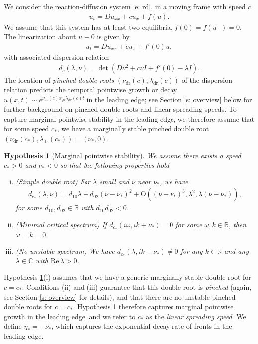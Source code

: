 \documentclass[11pt]{article}
\newcommand{\R}{\mathbb{R}}
\newcommand{\C}{\mathbb{C}}
\renewcommand{\Re}{\mathrm{Re} \,}
\newtheorem{hyp}{Hypothesis}
\numberwithin{equation}{section}
\numberwithin{prop}{section}
\begin{document}
We consider the reaction-diffusion system \eqref{e: rd}, in a moving frame with speed $c$
\begin{align}
u_t = Du_{xx} + c u_x + f(u). 
\end{align}
We assume that this system has at least two equilibria, $f(0) = f(u_-) = 0$. The linearization about $u \equiv 0$ is given by
\begin{align}
u_t = D u_{xx} + c u_x + f'(0) u, \label{e: rd lin}
\end{align}
with associated dispersion relation
\begin{align}
d_c (\lambda, \nu) = \det \left(D\nu^2 + c \nu I + f'(0) - \lambda I \right). \label{e: dispersion relation}
\end{align}
The location of \emph{pinched double roots} $(\nu_\mathrm{dr}(c), \lambda_\mathrm{dr}(c))$ of the dispersion relation predicts the temporal pointwise growth or decay $u(x,t) \sim e^{\nu_\mathrm{dr} (c) x} e^{\lambda_\mathrm{dr} (c) t}$ in the leading edge; see Section \ref{s: overview} below for further background on pinched double roots and linear spreading speeds. To capture marginal pointwise stability in the leading edge, we therefore assume that for some speed $c_*$, we have a marginally stable pinched double root $(\nu_\mathrm{dr} (c_*), \lambda_\mathrm{dr} (c_*)) = (\nu_*, 0)$. 

\begin{hyp}[Marginal pointwise stability] \label{hyp: dispersion reln}
	We assume there exists a speed $c_* > 0$ and $\nu_* < 0$ so that the following properties hold
	\begin{enumerate}[(i)]
		\item (Simple double root) For $\lambda$ small and $\nu$ near $\nu_*$, we have 
		\begin{align}
		d_{c_*} (\lambda, \nu) = d_{10} \lambda + d_{02} (\nu -\nu_*)^2 + \mathrm{O}\left((\nu-\nu_*)^3, \lambda^2, \lambda (\nu-\nu_*)\right), \label{e: hyp 1 simple pdr}
		\end{align}
		for some $d_{10}, d_{02} \in \R$ with $d_{10} d_{02} < 0$. 
		\item (Minimal critical spectrum) If $d_{c_*} (i \omega, ik + \nu_*) = 0$ for some $\omega, k \in \R$, then $\omega = k = 0$. 
		\item (No unstable spectrum) We have $d_{c_*}(\lambda, ik + \nu_*) \neq 0$ for any $k \in \R$ and any $\lambda \in \C$ with $\Re \lambda > 0$. 
	\end{enumerate}
\end{hyp}
Hypothesis \ref{hyp: dispersion reln}(i) assumes that we have a generic marginally stable double root for $c = c_*$. Conditions (ii) and (iii) guarantee that this double root is \emph{pinched} (again, see Section \ref{s: overview} for details), and that there are no unstable pinched double roots for $c = c_*$. Hypothesis \ref{hyp: dispersion reln} therefore captures marginal pointwise growth in the leading edge, and we refer to $c_*$ as the \emph{linear spreading speed}. We define $\eta_* = -\nu_*$, which captures the exponential decay rate of fronts in the leading edge. 
\end{document}

